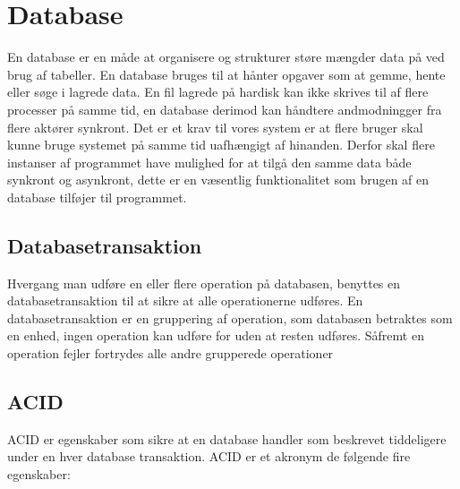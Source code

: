 \section{Database} 
\label{sec:database}

En database er en måde at organisere og strukturer støre mængder data på ved brug af tabeller. En database bruges til at hånter opgaver som at gemme, hente eller søge i lagrede data. En fil lagrede på hardisk kan ikke skrives til af flere processer på samme tid, en database derimod kan håndtere andmodningger fra flere aktører synkront. Det er et krav til vores system er at flere bruger skal kunne bruge systemet på samme tid uafhængigt af hinanden. Derfor skal flere instanser af programmet have mulighed for at tilgå den samme data både synkront og asynkront, dette er en væsentlig funktionalitet som brugen af en database tilføjer til programmet\cite{DatabaseMicosoftOffice}. 

\subsection{Databasetransaktion}
\label{sub:databasetransaktion}

Hvergang man udføre en eller flere operation på databasen, benyttes en databasetransaktion til at sikre at alle operationerne udføres. En databasetransaktion er en gruppering af operation, som databasen betraktes som en enhed, ingen operation kan udføre for uden at resten udføres. Såfremt en operation fejler fortrydes alle andre grupperede operationer\cite{databasetransaktion}

\subsection{ACID}
\label{sub:acid}

ACID er egenskaber som sikre at en database handler som beskrevet tiddeligere under en hver database transaktion. ACID er et akronym de følgende fire egenskaber: 

